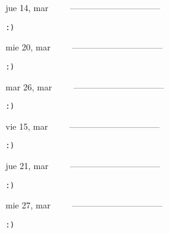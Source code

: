 \documentclass[letterpaper,10pt]{article}
\begin{document}
\begin{multicols}{3}
{jue 14, mar\ \ \ \ \ --------------------------------}
\begin{flushright}\begin{small}\texttt{:)}\end{small}\end{flushright}
\vfill
{mie 20, mar\ \ \ \ \ --------------------------------}
\begin{flushright}\begin{small}\texttt{:)}\end{small}\end{flushright}\par
\vfill
{mar 26, mar\ \ \ \ \ --------------------------------}
\begin{flushright}\begin{small}\texttt{:)}\end{small}\end{flushright}\par
\vfill
\end{multicols}
\vspace{1.05cm}

\begin{multicols}{3}
{vie 15, mar\ \ \ \ \ --------------------------------}
\begin{flushright}\begin{small}\texttt{:)}\end{small}\end{flushright}
\vfill
{jue 21, mar\ \ \ \ \ --------------------------------}
\begin{flushright}\begin{small}\texttt{:)}\end{small}\end{flushright}\par
\vfill
{mie 27, mar\ \ \ \ \ --------------------------------}
\begin{flushright}\begin{small}\texttt{:)}\end{small}\end{flushright}\par
\vfill
\end{multicols}
\vspace{1.05cm}
\end{document}
